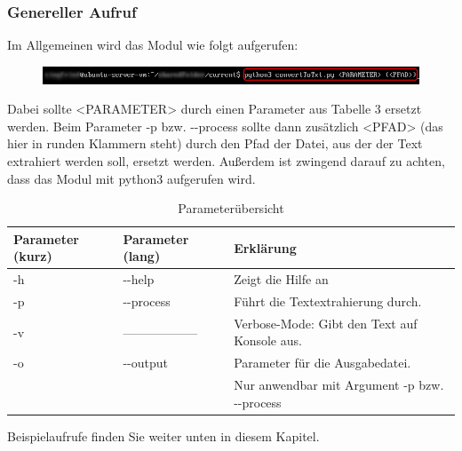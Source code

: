 \documentclass[12pt]{scrartcl}
\begin{document}
\subsubsection{Genereller Aufruf}
\label{sec:first-steps-general}
Im Allgemeinen wird das Modul wie folgt aufgerufen:
\begin{figure}[htbp]
\includegraphics[width=1.0\textwidth]{ersteSchritte001}\par\vspace{0.25cm}
\label{fig:ersteSchritteGeneral001}
\end{figure}
\newline
Dabei sollte <PARAMETER> durch einen Parameter aus Tabelle 3 ersetzt werden. Beim Parameter -p bzw. -{}-process sollte dann zusätzlich <PFAD> (das hier in runden Klammern steht) durch den Pfad der Datei, aus der der Text extrahiert werden soll, ersetzt werden. 
Außerdem ist zwingend darauf zu achten, dass das Modul mit python3 aufgerufen wird.
\begin{table}[H]
\begin{center}
\label{params}
\begin{tabular}{|l|l|l|}
\hline
\rowcolor[HTML]{C0C0C0} 
Parameter (kurz) & Parameter (lang) & Erklärung                                                                                                                              \\ \hline
-h               & -{}-help           & Zeigt die Hilfe an                                                                                                                     \\ \hline
-p               & -{}-process        & Führt die Textextrahierung durch.  \\ \hline
-v				 & ------------------ & Verbose-Mode: Gibt den Text auf Konsole aus. \\ \hline
-o               & -{}-output         & Parameter für die Ausgabedatei.\\
				 &					  &	Nur anwendbar mit Argument -p bzw. -{}-process \\ \hline
\end{tabular}
\caption{Parameterübersicht}
\end{center}
\end{table}

Beispielaufrufe finden Sie weiter unten in diesem Kapitel. 
\newpage
\end{document}
